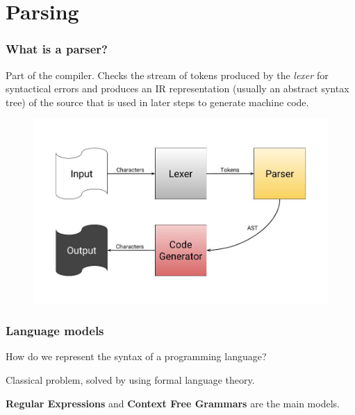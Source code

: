 \section{Parsing}
\begin{frame}
	\frametitle{What is a parser?}
    \begin{block}{}
        
        Part of the compiler.
        Checks the stream of tokens produced by the \emph{lexer} for syntactical errors
        and produces an IR representation (usually an abstract syntax tree) of the source 
        that is used in later steps to generate machine code.
    \end{block}
    \begin{figure}
        \includegraphics[width=\textwidth,height=.6\textheight]{img/parser.jpg}
    \end{figure}
\end{frame}
\begin{frame}
    \frametitle{Language models}
    
    \begin{block}{}How do we represent the syntax of a programming language?\end{block}
    \pause
    \begin{block}{}Classical problem, solved by using formal language theory.\end{block}
    \pause

    \begin{block}{}{\textbf{Regular Expressions} and \textbf{Context Free Grammars } are the main models.}\end{block}

\end{frame}
